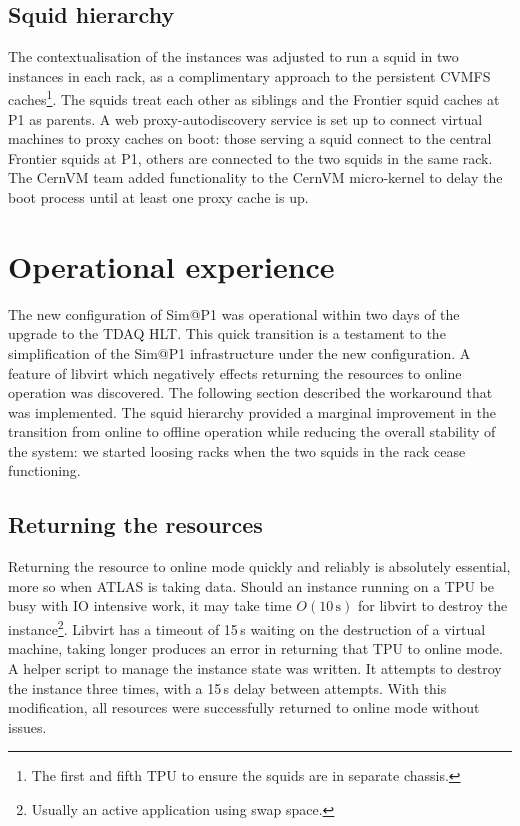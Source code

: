 \documentclass{webofc}
\begin{document}
\subsection{Squid hierarchy}\label{sec:hierarchy}
The contextualisation of the instances was adjusted to run a squid in two
instances in each rack, as a complimentary approach to the persistent CVMFS
caches\footnote{The first and fifth TPU to ensure the squids are in
separate chassis.}. The squids treat each other as siblings and the Frontier
squid caches at P1 as parents. A web proxy-autodiscovery service is set up to
connect virtual machines to proxy caches on boot: those serving a squid
connect to the central Frontier squids at P1, others are connected to the two
squids in the same rack. The CernVM team added functionality to the CernVM
micro-kernel to delay the boot process until at least one proxy cache is up.


\section{Operational experience}\label{sec:ops}
The new configuration of Sim@P1 was operational within two days of the upgrade
to the TDAQ HLT\@. This quick transition is a testament to the simplification of
the Sim@P1 infrastructure under the new configuration. A feature of libvirt
which negatively effects returning the resources to online operation was
discovered. The following section described the workaround that was implemented.
The squid hierarchy provided a marginal improvement in the transition from
online to offline operation while reducing the overall stability of the system:
we started loosing racks when the two squids in the rack cease functioning.

\subsection{Returning the resources}\label{sec:return}
Returning the resource to online mode quickly and reliably is absolutely
essential, more so when ATLAS is taking data. Should an instance running on a
TPU be busy with IO intensive work, it may take time $O(10\,\mathrm{s})$ for
libvirt to destroy the instance\footnote{Usually an active application using
swap space.}. Libvirt has a timeout of 15\,\textrm{s} waiting on the destruction
of a virtual machine, taking longer produces an error in returning that TPU to
online mode. A helper script to manage the instance state was written. It
attempts to destroy the instance three times, with a 15\,\textrm{s} delay between
attempts. With this modification, all resources were successfully returned to
online mode without issues.
\end{document}
